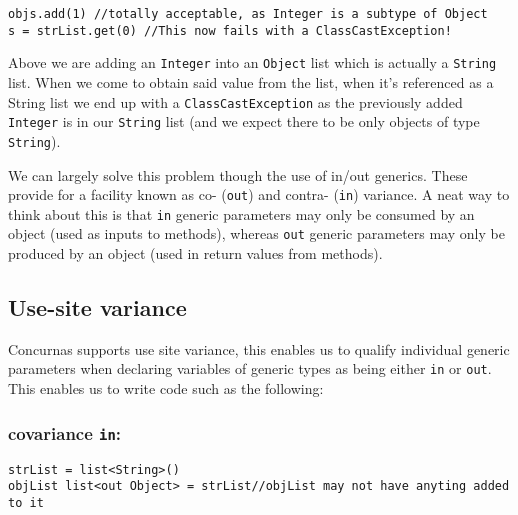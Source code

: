 \documentclass[conc-doc]{subfiles}
\begin{document}
\begin{lstlisting}
objs.add(1) //totally acceptable, as Integer is a subtype of Object
s = strList.get(0) //This now fails with a ClassCastException!
\end{lstlisting}

Above we are adding an \lstinline{Integer} into an \lstinline{Object} list which is actually a \lstinline{String} list. When we come to obtain said value from the list, when it's referenced as a String list we end up with a \lstinline{ClassCastException} as the previously added \lstinline{Integer} is in our \lstinline{String} list (and we expect there to be only objects of type \lstinline{String}).

We can largely solve this problem though the use of in/out generics. These provide for a facility known as co- (\lstinline{out}) and contra- (\lstinline{in}) variance. A neat way to think about this is that \lstinline{in} generic parameters may only be consumed by an object (used as inputs to methods), whereas \lstinline{out} generic parameters may only be produced by an object (used in return values from methods).

%


\subsection{Use-site variance}
Concurnas supports use site variance, this enables us to qualify individual generic parameters when declaring variables of generic types as being either \lstinline{in} or \lstinline{out}. This enables us to write code such as the following:

\subsubsection{covariance \lstinline!in!:}

\begin{lstlisting}
strList = list<String>()
objList list<out Object> = strList//objList may not have anyting added to it
\end{lstlisting}
\end{document}
